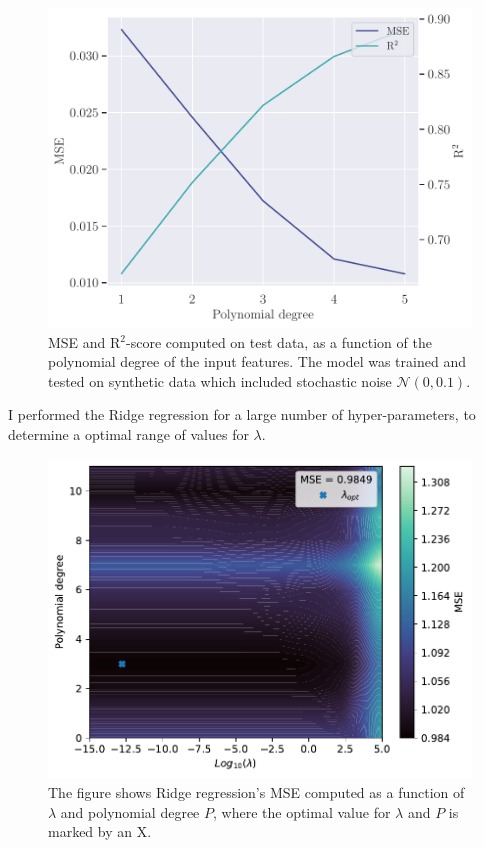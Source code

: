 \begin{figure}
    \centering
    \includegraphics[width=0.9\linewidth]{project-1/latex/figures/ols_error_scaled_N50.pdf}
    \caption{MSE and R$^{2}$-score computed on test data, as a function of the polynomial degree of the input features. The model was trained and tested on synthetic data which included stochastic noise $\mathcal{N}(0, 0.1)$.}
    \label{fig:ols_error}
\end{figure}

I performed the Ridge regression for a large number of hyper-parameters, to determine a optimal range of values for $\lambda$. 
\begin{figure}
    \centering
    \includegraphics[width=0.9\linewidth]{project-1/latex/figures/dev-figs/lmbda_opt.pdf}
    \caption{The figure shows Ridge regression's MSE computed as a function of $\lambda$ and polynomial degree $P$, where the optimal value for $\lambda$ and $P$ is marked by an X.}
    \label{fig:lmbda_opt}
\end{figure}